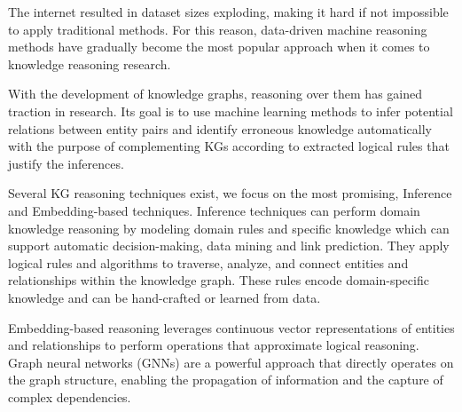 The internet resulted in dataset sizes exploding, making it hard if not impossible to apply traditional methods. For this reason, data-driven machine reasoning methods have gradually become the most popular approach when it comes to knowledge reasoning research.

With the development of knowledge graphs, reasoning over them has gained traction in research. Its goal is to use machine learning methods to infer potential relations between entity pairs and identify erroneous knowledge automatically with the purpose of complementing KGs according to extracted logical rules that justify the inferences.




Several KG reasoning techniques exist, we focus on the most promising, Inference and Embedding-based techniques. Inference techniques can perform domain knowledge reasoning by modeling domain rules and specific knowledge which can support automatic decision-making, data mining and link prediction. They apply logical rules and algorithms to traverse, analyze, and connect entities and relationships within the knowledge graph. These rules encode domain-specific knowledge and can be hand-crafted or learned from data.


Embedding-based reasoning leverages continuous vector representations of entities and relationships to perform operations that approximate logical reasoning. Graph neural networks (GNNs) \cite{sola2022} are a powerful approach that directly operates on the graph structure, enabling the propagation of information and the capture of complex dependencies.



